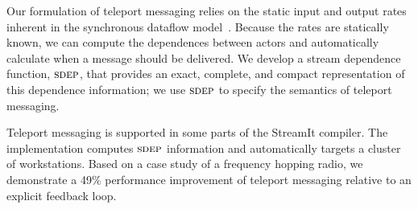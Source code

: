 Our formulation of teleport messaging relies on the static input and
output rates inherent in the synchronous dataflow
model~\cite{lee_static_1987}.  Because the rates are statically known, we can
compute the dependences between actors and automatically calculate
when a message should be delivered.  We develop a stream dependence
function, $\textsc{sdep}$, that provides an exact, complete, and compact
representation of this dependence information; we use $\textsc{sdep}$ to
specify the semantics of teleport messaging.

Teleport messaging is supported in some parts of the StreamIt
compiler.  The implementation computes $\textsc{sdep}$ information and
automatically targets a cluster of workstations.  Based on a case
study of a frequency hopping radio, we demonstrate a 49\% performance
improvement of teleport messaging relative to an explicit feedback
loop.



				   
